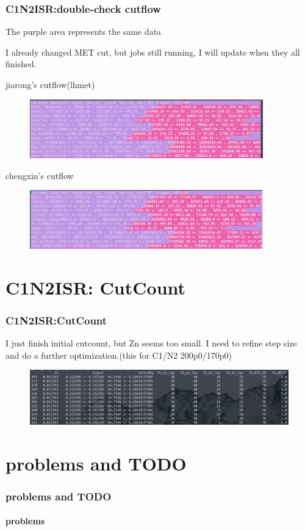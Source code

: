 \documentclass[usenames,dvipsnames]{beamer}
\begin{document}
\begin{frame}
\frametitle{C1N2ISR:double-check cutflow}
The purple area represents the same data

I already changed MET cut, but jobs still running, I will update when they all finished.

jiarong's cutflow(lhmet)
\begin{figure}
	\centering
	\includegraphics[width = 0.9\textwidth]{graphics/jiaronglhcutflow}
	\label{jiarong's lh cutflow}
\end{figure}
chengxin's cutflow
\begin{figure}
	\centering
	\includegraphics[width = 0.9\textwidth]{graphics/chengxinlhcutflow}
	\label{chengxin's lh cutflow}
\end{figure}
\end{frame}

\section{C1N2ISR: CutCount}
\begin{frame}
	\frametitle{C1N2ISR:CutCount}
	I just finish initial cutcount, but Zn seems too small. I need to refine step size and do a further optimization.(this for C1/N2 200p0/170p0)
	\begin{figure}
		\centering
		\includegraphics[width = 1.0\textwidth]{graphics/cutcount.png}
	\end{figure}
\end{frame}
\section{problems and TODO}
\begin{frame}
	\frametitle{problems and TODO}
	\framesubtitle{problems}
	
\end{frame}
\end{document}
